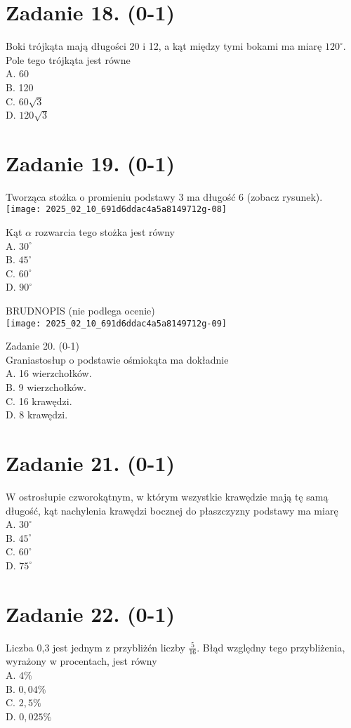\documentclass[10pt]{article}
\begin{document}
\section*{Zadanie 18. (0-1)}
Boki trójkąta mają długości 20 i 12, a kąt między tymi bokami ma miarę \(120^{\circ}\). Pole tego trójkąta jest równe\\
A. 60\\
B. 120\\
C. \(60 \sqrt{3}\)\\
D. \(120 \sqrt{3}\)

\section*{Zadanie 19. (0-1)}
Tworząca stożka o promieniu podstawy 3 ma długość 6 (zobacz rysunek).\\
\texttt{[image: 2025\_02\_10\_691d6ddac4a5a8149712g-08]}

Kąt \(\alpha\) rozwarcia tego stożka jest równy\\
A. \(30^{\circ}\)\\
B. \(45^{\circ}\)\\
C. \(60^{\circ}\)\\
D. \(90^{\circ}\)

BRUDNOPIS (nie podlega ocenie)\\
\texttt{[image: 2025\_02\_10\_691d6ddac4a5a8149712g-09]}

Zadanie 20. (0-1)\\
Graniastosłup o podstawie ośmiokąta ma dokładnie\\
A. 16 wierzchołków.\\
B. 9 wierzchołków.\\
C. 16 krawędzi.\\
D. 8 krawędzi.

\section*{Zadanie 21. (0-1)}
W ostrosłupie czworokątnym, w którym wszystkie krawędzie mają tę samą długość, kąt nachylenia krawędzi bocznej do płaszczyzny podstawy ma miarę\\
A. \(30^{\circ}\)\\
B. \(45^{\circ}\)\\
C. \(60^{\circ}\)\\
D. \(75^{\circ}\)

\section*{Zadanie 22. (0-1)}
Liczba 0,3 jest jednym z przybliżén liczby \(\frac{5}{16}\). Błąd względny tego przybliżenia, wyrażony w procentach, jest równy\\
A. \(4 \%\)\\
B. \(0,04 \%\)\\
C. \(2,5 \%\)\\
D. \(0,025 \%\)
\end{document}
